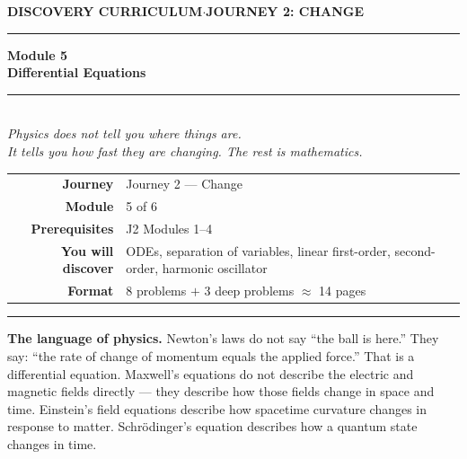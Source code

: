 \documentclass[12pt, a4paper]{article}
\newcounter{problem}
\begin{document}

\thispagestyle{empty}
\begin{center}
{\small\color{MidBlue}\textbf{DISCOVERY CURRICULUM}\quad$\cdot$\quad\textbf{JOURNEY 2: CHANGE}}

\vspace{0.6cm}
{\color{NavyBlue}\rule{\linewidth}{2pt}}
\vspace{0.5cm}

{\Huge\bfseries\color{NavyBlue}Module 5}\\[0.3cm]
{\LARGE\bfseries\color{MidBlue}Differential Equations}\\[0.4cm]
{\color{Gold}\rule{0.4\linewidth}{1.2pt}}\\[0.4cm]
{\large\itshape\color{DarkGrey}
Physics does not tell you where things are.\\[0.15cm]
It tells you how fast they are changing. The rest is mathematics.}

\vspace{1cm}
\begin{tabular}{rl}
\color{DarkGrey}\textbf{Journey}           & Journey 2 --- Change \\[4pt]
\color{DarkGrey}\textbf{Module}            & 5 of 6 \\[4pt]
\color{DarkGrey}\textbf{Prerequisites}     & J2 Modules 1--4 \\[4pt]
\color{DarkGrey}\textbf{You will discover} & ODEs, separation of variables, linear first-order, second-order, harmonic oscillator \\[4pt]
\color{DarkGrey}\textbf{Format}            & 8 problems $+$ 3 deep problems $\approx$ 14 pages \\
\end{tabular}

\vspace{1cm}
{\color{NavyBlue}\rule{\linewidth}{2pt}}
\end{center}

\vspace{0.5cm}

\noindent\textbf{The language of physics.}
Newton's laws do not say ``the ball is here.'' They say: ``the rate of change of momentum equals the applied force.'' That is a differential equation. Maxwell's equations do not describe the electric and magnetic fields directly --- they describe how those fields change in space and time. Einstein's field equations describe how spacetime curvature changes in response to matter. Schr\"{o}dinger's equation describes how a quantum state changes in time.
\end{document}
